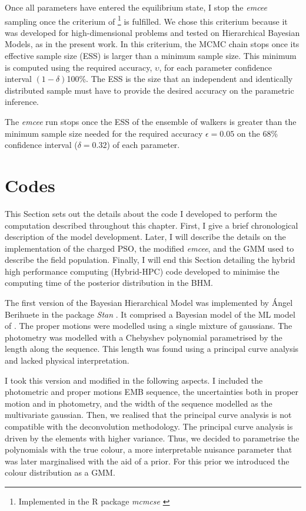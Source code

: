 Once all parameters have entered the equilibrium state, I stop the \emph{emcee} sampling once the criterium of \citet{Gong2016} \footnote{Implemented in the R package \emph{mcmcse} \citep{mcmcse}} is fulfilled. We chose this criterium because it was developed for high-dimensional problems and tested on Hierarchical Bayesian Models, as in the present work. In this criterium, the MCMC chain stops once its effective sample size (ESS) is larger than a minimum sample size. This minimum is computed using the required accuracy, $\upsilon$, for each parameter confidence interval $(1-\delta)$100\%. The ESS is the size that an independent and identically distributed sample must have to provide the desired accuracy on the parametric inference. 

The \emph{emcee} run stops once the ESS of the ensemble of walkers is greater than the minimum sample size needed for the required accuracy $\epsilon = 0.05$ on the 68\% confidence interval ($\delta = 0.32$) of each parameter.


\section{Codes}
\label{sect:code}
This Section sets out the details about the code I developed to perform the computation described throughout this chapter. First, I give a brief chronological description of the model development. Later, I will describe the details on the implementation of the charged PSO, the modified \emph{emcee}, and the GMM used to describe the field population. Finally, I will end this Section detailing the hybrid high performance computing (Hybrid-HPC) code developed to minimise the computing time of the posterior distribution in the BHM.

The first version of the Bayesian Hierarchical Model was implemented by \'Angel Berihuete in the package \emph{Stan} \citep{Stan}. It comprised a Bayesian model of the ML model of \citet{Sarro2014}. The proper motions were modelled using a single mixture of gaussians. The photometry was modelled with a Chebyshev polynomial parametrised by the length along the sequence. This length was found using a principal curve analysis and lacked physical interpretation.

I took this version and modified in the following aspects. I included the photometric and proper motions EMB sequence, the uncertainties both in proper motion and in photometry, and the width of the sequence modelled as the multivariate gaussian. Then, we realised that the principal curve analysis is not compatible with the deconvolution methodology. The principal curve analysis is driven by the elements with higher variance. Thus, we decided to parametrise the polynomials with the true colour, a more interpretable nuisance parameter that was later marginalised with the aid of a prior. For this prior we introduced the colour distribution as a GMM. 

